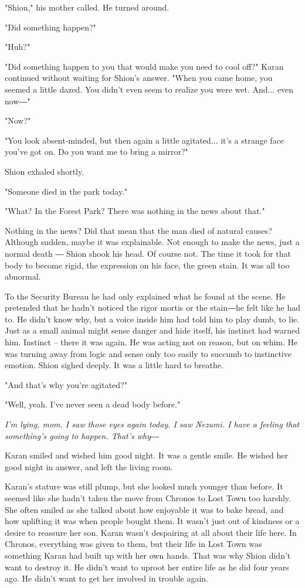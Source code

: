 "Shion," his mother called. He turned around.

"Did something happen?"

"Huh?"

"Did something happen to you that would make you need to cool off?"
Karan continued without waiting for Shion's answer. "When you came home,
you seemed a little dazed. You didn't even seem to realize you were wet.
And... even now―"

"Now?"

"You look absent-minded, but then again a little agitated... it's a
strange face you've got on. Do you want me to bring a mirror?"

Shion exhaled shortly.

"Someone died in the park today."

"What? In the Forest Park? There was nothing in the news about that."

Nothing in the news? Did that mean that the man died of natural causes?
Although sudden, maybe it was explainable. Not enough to make the news,
just a normal death ― Shion shook his head. Of course not. The time it
took for that body to become rigid, the expression on his face, the
green stain. It was all too abnormal.

To the Security Bureau he had only explained what he found at the scene.
He pretended that he hadn't noticed the rigor mortis or the stain―he
felt like he had to. He didn't know why, but a voice inside him had told
him to play dumb, to lie. Just as a small animal might sense danger and
hide itself, his instinct had warned him. Instinct -- there it was again.
He was acting not on reason, but on whim. He was turning away from logic
and sense only too easily to succumb to instinctive emotion. Shion
sighed deeply. It was a little hard to breathe.

"And that's why you're agitated?"

"Well, yeah. I've never seen a dead body before."

\emph{I'm lying, mom. I saw those eyes again today. I saw Nezumi. I have a
feeling that something's going to happen. That's why―}

Karan smiled and wished him good night. It was a gentle smile. He wished
her good night in answer, and left the living room.

Karan's stature was still plump, but she looked much younger than
before. It seemed like she hadn't taken the move from Chronos to Lost
Town too harshly. She often smiled as she talked about how enjoyable it
was to bake bread, and how uplifting it was when people bought them. It
wasn't just out of kindness or a desire to reassure her son. Karan
wasn't despairing at all about their life here. In Chronos, everything
was given to them, but their life in Lost Town was something Karan had
built up with her own hands. That was why Shion didn't want to destroy
it. He didn't want to uproot her entire life as he did four years ago.
He didn't want to get her involved in trouble again.

